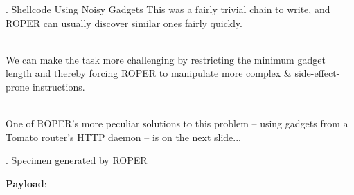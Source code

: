 \documentclass[9pt]{beamer}
\newcommand{\Gap} { \\ \ \vspace{8pt} }
\begin{document}
\begin{frame}{\theframenumber. Shellcode Using Noisy Gadgets}
  This was a fairly trivial chain to write, and ROPER can usually discover similar ones fairly quickly. \Gap
  
  We can make the task more challenging by restricting the minimum gadget length and thereby forcing ROPER to manipulate more complex \& side-effect-prone instructions. \Gap
  
  One of ROPER's more peculiar solutions to this problem -- using gadgets from a Tomato router's HTTP daemon -- is on the next slide...
\end{frame}

\begin{frame}{\theframenumber. Specimen generated by ROPER}

  \tiny
  \textbf{Payload}:
  \\
  

\end{frame}
\end{document}
